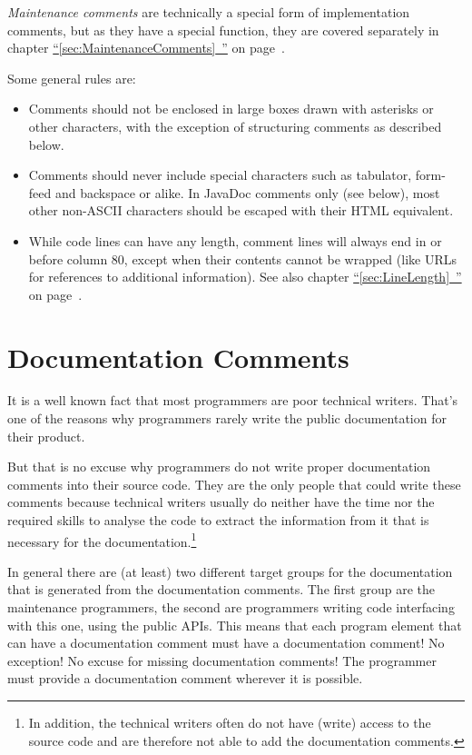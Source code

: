 \documentclass[11pt,a4paper, titlepage, parskip=half, headsepline, footsepline, cleardoublepage=current, headheight=1cm]{scrbook}
\newcommand*{\tqfullvref}[1]{\hyperref[{#1}]{“\ref*{#1}~\nameref*{#1}”} on page~\pageref{#1}}
\begin{document}
\textit{Maintenance comments} are technically a special form of implementation comments, but as they have a special function, they are covered separately in chapter \tqfullvref{sec:MaintenanceComments}.

Some general rules are:
\begin{itemize}
\item{Comments should not be enclosed in large boxes drawn with asterisks or other characters, with the exception of structuring comments as described below.}

\item{Comments should never include special characters such as tabulator, form-feed and backspace or alike. In JavaDoc comments only (see below), most other non-ASCII characters should be escaped with their HTML equivalent.}

\item{While code lines can have any length, comment lines will always end in or before column 80, except when their contents cannot be wrapped (like URLs for references to additional information). See also chapter \tqfullvref{sec:LineLength}.}
\end{itemize}


\section{Documentation Comments}\label{sec:DocumentationComments}
It is a well known fact that most programmers are poor technical writers. That's one of the reasons why programmers rarely write the public documentation for their product.

But that is no excuse why programmers do not write proper documentation comments into their source code. They are the only people that could write these comments because technical writers usually do neither have the time nor the required skills to analyse the code to extract the information from it that is necessary for the documentation.\footnote{In addition, the technical writers often do not have (write) access to the source code and are therefore not able to add the documentation comments.}

In general there are (at least) two different target groups for the documentation that is generated from the documentation comments. The first group are the maintenance programmers, the second are programmers writing code interfacing with this one, using the public APIs. This means that each program element that can have a documentation comment must have a documentation comment! No exception! No excuse for missing documentation comments! The programmer must provide a documentation comment wherever it is possible. 
\end{document}

